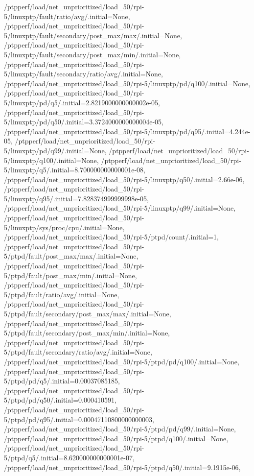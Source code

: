 {    /ptpperf/load/net_unprioritized/load_50/rpi-5/linuxptp/fault/ratio/avg/.initial=None,
    /ptpperf/load/net_unprioritized/load_50/rpi-5/linuxptp/fault/secondary/post_max/max/.initial=None,
    /ptpperf/load/net_unprioritized/load_50/rpi-5/linuxptp/fault/secondary/post_max/min/.initial=None,
    /ptpperf/load/net_unprioritized/load_50/rpi-5/linuxptp/fault/secondary/ratio/avg/.initial=None,
    /ptpperf/load/net_unprioritized/load_50/rpi-5/linuxptp/pd/q100/.initial=None,
    /ptpperf/load/net_unprioritized/load_50/rpi-5/linuxptp/pd/q5/.initial=2.8219000000000002e-05,
    /ptpperf/load/net_unprioritized/load_50/rpi-5/linuxptp/pd/q50/.initial=3.3724000000000004e-05,
    /ptpperf/load/net_unprioritized/load_50/rpi-5/linuxptp/pd/q95/.initial=4.244e-05,
    /ptpperf/load/net_unprioritized/load_50/rpi-5/linuxptp/pd/q99/.initial=None,
    /ptpperf/load/net_unprioritized/load_50/rpi-5/linuxptp/q100/.initial=None,
    /ptpperf/load/net_unprioritized/load_50/rpi-5/linuxptp/q5/.initial=8.700000000000001e-08,
    /ptpperf/load/net_unprioritized/load_50/rpi-5/linuxptp/q50/.initial=2.66e-06,
    /ptpperf/load/net_unprioritized/load_50/rpi-5/linuxptp/q95/.initial=7.828374999999998e-05,
    /ptpperf/load/net_unprioritized/load_50/rpi-5/linuxptp/q99/.initial=None,
    /ptpperf/load/net_unprioritized/load_50/rpi-5/linuxptp/sys/proc/cpu/.initial=None,
    /ptpperf/load/net_unprioritized/load_50/rpi-5/ptpd/count/.initial=1,
    /ptpperf/load/net_unprioritized/load_50/rpi-5/ptpd/fault/post_max/max/.initial=None,
    /ptpperf/load/net_unprioritized/load_50/rpi-5/ptpd/fault/post_max/min/.initial=None,
    /ptpperf/load/net_unprioritized/load_50/rpi-5/ptpd/fault/ratio/avg/.initial=None,
    /ptpperf/load/net_unprioritized/load_50/rpi-5/ptpd/fault/secondary/post_max/max/.initial=None,
    /ptpperf/load/net_unprioritized/load_50/rpi-5/ptpd/fault/secondary/post_max/min/.initial=None,
    /ptpperf/load/net_unprioritized/load_50/rpi-5/ptpd/fault/secondary/ratio/avg/.initial=None,
    /ptpperf/load/net_unprioritized/load_50/rpi-5/ptpd/pd/q100/.initial=None,
    /ptpperf/load/net_unprioritized/load_50/rpi-5/ptpd/pd/q5/.initial=0.00037085185,
    /ptpperf/load/net_unprioritized/load_50/rpi-5/ptpd/pd/q50/.initial=0.000410591,
    /ptpperf/load/net_unprioritized/load_50/rpi-5/ptpd/pd/q95/.initial=0.00047110800000000003,
    /ptpperf/load/net_unprioritized/load_50/rpi-5/ptpd/pd/q99/.initial=None,
    /ptpperf/load/net_unprioritized/load_50/rpi-5/ptpd/q100/.initial=None,
    /ptpperf/load/net_unprioritized/load_50/rpi-5/ptpd/q5/.initial=8.620000000000001e-07,
    /ptpperf/load/net_unprioritized/load_50/rpi-5/ptpd/q50/.initial=9.1915e-06,
}
